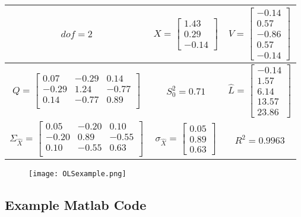 \begin{table}[htbp]
	\centering
	\begin{tabular}{|c|c|c|}
		\toprule
		$dof = 2$
		&
		$\hat{X} = 
		\begin{bmatrix}
		1.43\\0.29\\-0.14
		\end{bmatrix}$
		&
		$V = 
		\begin{bmatrix}
		-0.14\\0.57\\-0.86\\0.57\\-0.14
		\end{bmatrix}$
		\\	\midrule
		$Q = \begin{bmatrix}
		0.07 & -0.29 & 0.14 \\ 
		-0.29 & 1.24 & -0.77 \\ 
		0.14 & -0.77 & 0.89 \\ 
		\end{bmatrix}$
		&
		$S_0^2 = 0.71$
		&
		$\hat{L} = 
		\begin{bmatrix}
		-0.14\\1.57\\6.14\\13.57\\23.86
		\end{bmatrix}$
		\\	\midrule
		$\Sigma_{\hat{X}} = \begin{bmatrix}
		0.05 & -0.20 & 0.10 \\ 
		-0.20 & 0.89 & -0.55 \\ 
		0.10 & -0.55 & 0.63 \\ 
		\end{bmatrix}$
		&
		$\sigma_{\hat{X}} = 
		\begin{bmatrix}
		0.05\\0.89\\0.63 
		\end{bmatrix}$
		&
		$R^2 = 0.9963$
		\\
		\bottomrule
	\end{tabular}%
\end{table}%
\begin{figure}[H]
	\centering
	\texttt{[image: OLSexample.png]}
\end{figure}
\clearpage

\subsection{Example Matlab Code}


